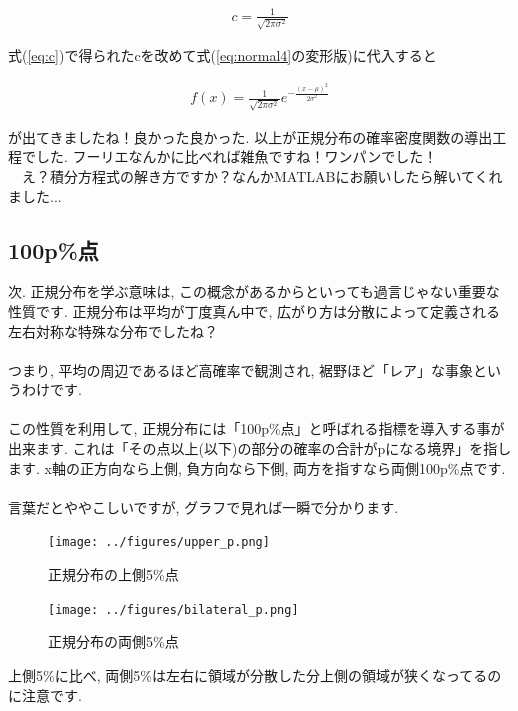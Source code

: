 \documentclass[11pt,a4paper,uplatex]{ujreport} 	%
\begin{document}
\begin{align}
\label{eq:c}
c = \frac{1}{\sqrt{2\pi\sigma^2}}
\end{align}

式(\ref{eq:c})で得られたcを改めて式(\ref{eq:normal4}の変形版)に代入すると

\begin{align}
f(x) = \frac{1}{\sqrt{2\pi\sigma^2}}e^{-\frac{(x-\mu)^2}{2\sigma^2}}
\end{align}

が出てきましたね！良かった良かった. 以上が正規分布の確率密度関数の導出工程でした. フーリエなんかに比べれば雑魚ですね！ワンパンでした！\\
　え？積分方程式の解き方ですか？なんかMATLABにお願いしたら解いてくれました...

\subsection{100p\%点}
次. 正規分布を学ぶ意味は, この概念があるからといっても過言じゃない重要な性質です. 正規分布は平均が丁度真ん中で, 広がり方は分散によって定義される左右対称な特殊な分布でしたね？\\\\

つまり, 平均の周辺であるほど高確率で観測され, 裾野ほど「レア」な事象というわけです.\\\\

この性質を利用して, 正規分布には「100p\%点」と呼ばれる指標を導入する事が出来ます. これは「その点以上(以下)の部分の確率の合計がpになる境界」を指します. x軸の正方向なら上側, 負方向なら下側, 両方を指すなら両側100p\%点です. \\\\

言葉だとややこしいですが, グラフで見れば一瞬で分かります.


\begin{figure}[H]
\label{im:upper}
  \centering
  \texttt{[image: ../figures/upper\_p.png]}
  \caption{正規分布の上側5\%点}
\end{figure}

\begin{figure}[H]
\label{im:bilateral}
  \centering
  \texttt{[image: ../figures/bilateral\_p.png]}
  \caption{正規分布の両側5\%点}
\end{figure}

上側5\%に比べ, 両側5\%は左右に領域が分散した分上側の領域が狭くなってるのに注意です. \\
\\
\end{document}
